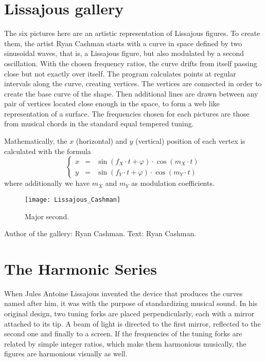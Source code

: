 \section{Lissajous gallery}
The six pictures here are an artistic representation of Lissajous figures. To create them, the artist Ryan Cashman starts with a curve in space defined by two sinusoidal waves, that is, a Lissajous figure, but also modulated by a second oscillation. With the chosen frequency ratios, the curve drifts from itself passing close but not exactly over itself. The program calculates points at regular intervals along the curve, creating vertices. The vertices are connected in order to create the base curve of the shape. Then additional lines are drawn between any pair of vertices located close enough in the space, to form a web like representation of a surface. The frequencies chosen for each pictures are those from musical chords in the standard equal tempered tuning.

Mathematically, the $x$ (horizontal) and $y$ (vertical) position of each vertex is calculated with the formula
$$\left\{ \begin{array}{rcl}
x &=& \sin(f_X\cdot t + \varphi) \cdot \cos(m_X \cdot t) \\
y &=& \sin(f_Y\cdot t + \varphi) \cdot \cos(m_Y \cdot t) 
\end{array} \right. $$
where additionally we have $m_X$ and $m_Y$ as modulation coefficients.


\begin{figure}[!h]
\centering
\texttt{[image: Lissajous\_Cashman]}
\caption*{Major second.}
\end{figure}


\vfill

Author of the gallery: Ryan Cashman.
Text: Ryan Cashman.


\section{The Harmonic Series}
When Jules Antoine Lissajous invented the device that produces the curves named after him, it was with the purpose of standardizing musical sound. In his original design, two tuning forks are placed perpendicularly, each with a mirror attached to its tip. A beam of light is directed to the first mirror, reflected to the second one and finally to a screen. If the frequencies of the tuning forks are related by simple integer ratios, which make them harmonious musically, the figures are harmonious visually as well.

